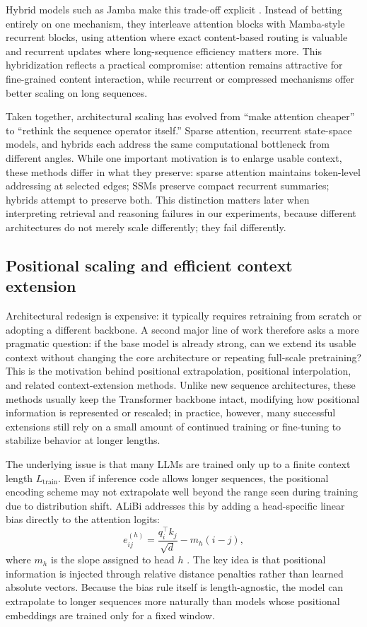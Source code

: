 \documentclass[11pt]{article}
\begin{document}
Hybrid models such as Jamba make this trade-off explicit \citep{lieber2024jamba}. Instead of betting entirely on one mechanism, they interleave attention blocks with Mamba-style recurrent blocks, using attention where exact content-based routing is valuable and recurrent updates where long-sequence efficiency matters more. This hybridization reflects a practical compromise: attention remains attractive for fine-grained content interaction, while recurrent or compressed mechanisms offer better scaling on long sequences.

Taken together, architectural scaling has evolved from “make attention cheaper” to “rethink the sequence operator itself.” Sparse attention, recurrent state-space models, and hybrids each address the same computational bottleneck from different angles. While one important motivation is to enlarge usable context, these methods differ in what they preserve: sparse attention maintains token-level addressing at selected edges; SSMs preserve compact recurrent summaries; hybrids attempt to preserve both. This distinction matters later when interpreting retrieval and reasoning failures in our experiments, because different architectures do not merely scale differently; they fail differently.

\subsection{Positional scaling and efficient context extension}

Architectural redesign is expensive: it typically requires retraining from scratch or adopting a different backbone. A second major line of work therefore asks a more pragmatic question: if the base model is already strong, can we extend its usable context without changing the core architecture or repeating full-scale pretraining? This is the motivation behind positional extrapolation, positional interpolation, and related context-extension methods. Unlike new sequence architectures, these methods usually keep the Transformer backbone intact, modifying how positional information is represented or rescaled; in practice, however, many successful extensions still rely on a small amount of continued training or fine-tuning to stabilize behavior at longer lengths.

The underlying issue is that many LLMs are trained only up to a finite context length $L_{\mathrm{train}}$. Even if inference code allows longer sequences, the positional encoding scheme may not extrapolate well beyond the range seen during training due to distribution shift. ALiBi addresses this by adding a head-specific linear bias directly to the attention logits:
\begin{equation}
e_{ij}^{(h)}=\frac{q_i^\top k_j}{\sqrt{d}} - m_h(i-j),
\end{equation}
where $m_h$ is the slope assigned to head $h$ \citep{press2022alibi}. The key idea is that positional information is injected through relative distance penalties rather than learned absolute vectors. Because the bias rule itself is length-agnostic, the model can extrapolate to longer sequences more naturally than models whose positional embeddings are trained only for a fixed window.
\end{document}
